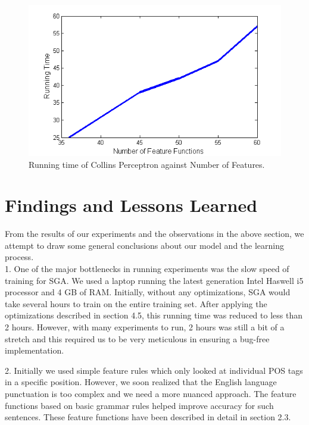 \documentclass[11pt,a4paper,oneside]{article}
\begin{document}
\begin{itemize}
\begin{figure}[H]
\centering
\includegraphics[width=\columnwidth]{CP_run}
\caption{Running time of Collins Perceptron against Number of Features.}
\label{fig:CP_run}
\end{figure}

\end{itemize}

\section{Findings and Lessons Learned}

From the results of our experiments and the observations in the above section, we attempt to draw some general conclusions about our model and the learning process.\\

1. One of the major bottlenecks in running experiments was the slow speed of training for SGA. We used a laptop running the latest generation Intel Haswell i5 processor and 4 GB of RAM. Initially, without any optimizations, SGA would take several hours to train on the entire training set. After applying the optimizations described in section 4.5, this running time was reduced to less than 2 hours. However, with many experiments to run, 2 hours was still a bit of a stretch and this required us to be very meticulous in ensuring a bug-free implementation.

2. Initially we used simple feature rules which only looked at individual POS tags in a specific position. However, we soon realized that the English language punctuation is too complex and we need a more nuanced approach. The feature functions based on basic grammar rules helped improve accuracy for such sentences. These feature functions have been described in detail in section 2.3.\\
\end{document}
